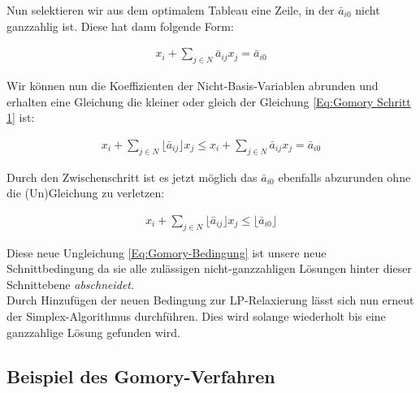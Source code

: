 \documentclass[tog]{acmsiggraph}
\begin{document}
Nun selektieren wir aus dem optimalem Tableau eine Zeile, in der $\bar{a}_{i0}$ nicht ganzzahlig ist. Diese hat dann folgende Form:

\large
\begin{align}
\label{Eq:Gomory Schritt 1}
x_i + \sum_{j \in N} \bar{a}_{ij} x_{j} = \bar{a}_{i0}
\end{align}
\normalsize

Wir können nun die Koeffizienten der Nicht-Basis-Variablen abrunden und erhalten eine Gleichung die kleiner oder gleich der Gleichung \ref{Eq:Gomory Schritt 1} ist:

\large
\begin{align}
\label{Eq:Gomory Schritt 2}
 x_i + \sum_{j \in N} \lfloor\bar{a}_{ij}\rfloor x_{j} \leq x_i + \sum_{j \in N} \bar{a}_{ij} x_{j} = \bar{a}_{i0}
\end{align}
\normalsize

Durch den Zwischenschritt ist es jetzt möglich das $\bar{a}_{i0}$ ebenfalls abzurunden ohne die (Un)Gleichung zu verletzen:

\large
\begin{align}
\label{Eq:Gomory-Bedingung}
 x_i + \sum_{j \in N} \lfloor\bar{a}_{ij}\rfloor x_{j} \leq \lfloor \bar{a}_{i0} \rfloor
\end{align}
\normalsize

Diese neue Ungleichung \ref{Eq:Gomory-Bedingung} ist unsere neue Schnittbedingung da sie alle zulässigen nicht-ganzzahligen Lösungen hinter dieser Schnittebene \textit{abschneidet}.\\
Durch Hinzufügen der neuen Bedingung zur LP-Relaxierung lässt sich nun erneut der Simplex-Algorithmus durchführen. Dies wird solange wiederholt bis eine ganzzahlige Lösung gefunden wird.

\subsection*{Beispiel des Gomory-Verfahren}
\end{document}

